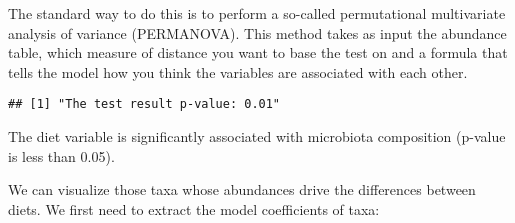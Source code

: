\documentclass[
  oneside]{book}
\newenvironment{Shaded}{\begin{snugshade}}{\end{snugshade}}
\newcommand{\AttributeTok}[1]{\textcolor[rgb]{0.77,0.63,0.00}{#1}}
\newcommand{\CommentTok}[1]{\textcolor[rgb]{0.56,0.35,0.01}{\textit{#1}}}
\newcommand{\DecValTok}[1]{\textcolor[rgb]{0.00,0.00,0.81}{#1}}
\newcommand{\FunctionTok}[1]{\textcolor[rgb]{0.00,0.00,0.00}{#1}}
\newcommand{\NormalTok}[1]{#1}
\newcommand{\OtherTok}[1]{\textcolor[rgb]{0.56,0.35,0.01}{#1}}
\newcommand{\SpecialCharTok}[1]{\textcolor[rgb]{0.00,0.00,0.00}{#1}}
\newcommand{\StringTok}[1]{\textcolor[rgb]{0.31,0.60,0.02}{#1}}
\begin{document}
The standard way to do this is to perform a so-called permutational
multivariate analysis of variance (PERMANOVA). This method takes as
input the abundance table, which measure of distance you want to base
the test on and a formula that tells the model how you think the
variables are associated with each other.

\begin{Shaded}
\end{Shaded}

\begin{verbatim}
## [1] "The test result p-value: 0.01"
\end{verbatim}

The diet variable is significantly associated with
microbiota composition (p-value is less than 0.05).

We can visualize those taxa whose abundances drive the
differences between diets. We first need to extract the model
coefficients of taxa:
\end{document}
